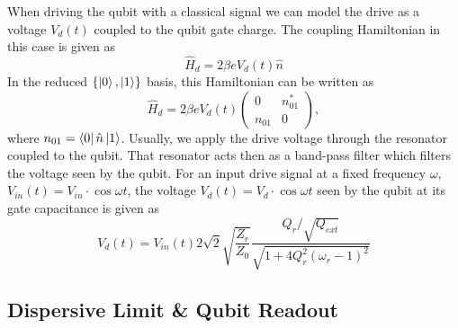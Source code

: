 When driving the qubit with a classical signal we can model the drive as a voltage $V_d(t)$ coupled to the qubit gate charge. The coupling Hamiltonian in this case is given as
%
\begin{equation}
\hat{H}_d = 2\beta e V_d(t) \hat{n}
\end{equation}
%
In the reduced $\{\left| 0 \right>,\left| 1 \right>\}$ basis, this Hamiltonian can be written as
%
\begin{equation}
\hat{H}_d = 2\beta e V_d(t)\left(\begin{array}{cc} 0 & n_{01}^* \\ n_{01} & 0 \end{array}\right), \label{eq:drive_hamiltonian}
\end{equation}
%
where $n_{01} = \left< 0 \right|\hat{n}\left| 1 \right>$. Usually, we apply the drive voltage through the resonator coupled to the qubit. That resonator acts then as a band-pass filter which filters the voltage seen by the qubit. For an input drive signal at a fixed frequency $\omega$, $V_{in}(t)=V_{in}\cdot\cos{\omega t}$, the voltage $V_d(t)=V_{d}\cdot\cos{\omega t}$ seen by the qubit at its gate capacitance is given as
%
\begin{equation}
V_{d}(t) = V_{in}(t) 2 \sqrt{2}\sqrt{\frac{Z_{r}}{Z_0}}\frac{Q_{r}/\sqrt{Q_{ext}}}{\sqrt{1+4Q_{r}^2(\omega_r-1)^2}} \label{eq:qubit_drive_voltage}
\end{equation}
%

\subsection{Dispersive Limit \& Qubit Readout}

